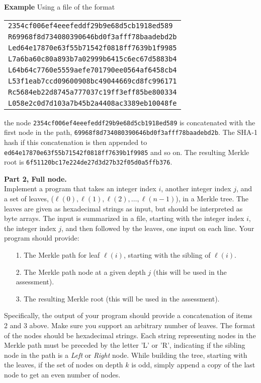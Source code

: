 \documentclass{article}
\begin{document}
\begin{description}
		{\bf Example} Using a file of the format
		\begin{center}
			\begin{tabular}{l}
				\texttt{2354cf006ef4eeefeddf29b9e68d5cb1918ed589}\\
				\texttt{R69968f8d734080390646bd0f3afff78baadebd2b}\\
				\texttt{Led64e17870e63f55b71542f0818ff7639b1f9985}\\
				\texttt{L7a6ba60c80a893b7a02999b6415c6ec67d5883b4}\\
				\texttt{L64b64c7760e5559aefe701790ee0564af6458cb4}\\
				\texttt{L53f1eab7ccd09600908bc49044669cd8fc996171}\\
				\texttt{Rc5684eb22d8745a777037c19ff3eff85be800334}\\
				\texttt{L058e2c0d7d103a7b45b2a4408ac3389eb10048fe}
			\end{tabular}
		\end{center}
		the node \texttt{2354cf006ef4eeefeddf29b9e68d5cb1918ed589} is concatenated with the first node in the path, \texttt{69968f8d734080390646bd0f3afff78baadebd2b}. The SHA-1 hash if this concatenation is then appended to \texttt{ed64e17870e63f55b71542f0818ff7639b1f9985} and so on. The resulting Merkle root is \texttt{6f51120bc17e224de27d3d27b32f05d0a5ffb376}.
		
		
		{\bf Part 2, Full node.}\\ Implement a program that takes an integer index $i$, another integer index $j$, and a set of leaves, ($\ell(0),\ell(1),\ell(2),\ldots,\ell(n-1)$), in a Merkle tree. The leaves are given as hexadecimal strings as input, but should be interpreted as byte arrays. The input is summarized in a file, starting with the integer index $i$, the integer index $j$, and then followed by the leaves, one input on each line. Your program should provide: 
		\begin{itemize}
			\item[1.] The Merkle path for leaf $\ell(i)$, starting with the sibling of $\ell(i)$.
			\item[2.] The Merkle path node at a given depth $j$ (this will be used in the assessment). 
			\item[3.] The resulting Merkle root (this will be used in the assessment).
		\end{itemize}
		Specifically, the output of your program should provide a concatenation of items 2 and 3 above. Make sure you support an arbitrary number of leaves. The format of the nodes should be hexadecimal strings. Each string representing nodes in the Merkle path must be preceded by the letter 'L' or 'R', indicating if the sibling node in the path is a \textit{Left} or \textit{Right} node. While building the tree, starting with the leaves, if the set of nodes on depth $k$ is odd, simply append a copy of the last node to get an even number of nodes.
		

\end{description}
\end{document}
